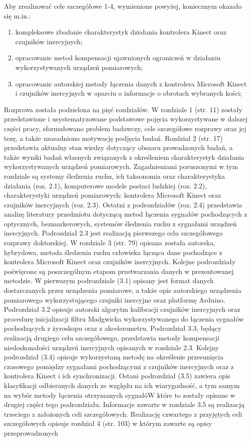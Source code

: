 \documentclass[10pt,a4paper]{report}
\begin{document}
\begin{FlushLeft}
Aby zrealizować cele szczegółowe 1-4, wymienione powyżej, koniecznym okazało się m.in.:
\begin{enumerate}[1. ]
	\item kompleksowe zbadanie charakterystyk działania kontrolera Kinect oraz czujników inercyjnych;
    \item opracowanie metod kompensacji ujawnionych ograniczeń w działaniu wykorzystywanych urządzeń pomiarowych;
	\item opracowanie autorskiej metody łączenia danych z kontrolera Microsoft Kinect i czujników inercyjnych w oparciu o informacje o obrotach wybranych kości;
\end{enumerate}

Rozprawa została podzielona na pięć rozdziałów. W rozdziale 1 (str. 11) zostały przedstawione i usystematyzowane podstawowe pojęcia wykorzystywane w dalszej części pracy, sformułowano problem badawczy, cele szczegółowe rozprawy oraz jej tezę, a także uzasadniono motywację podjęcia badań. Rozdział 2 (str. 17) przedstawia aktualny stan wiedzy dotyczący obszaru prowadzonych badań, a także wyniki badań własnych związanych z określeniem charakterystyk działania wykorzystywanych urządzeń pomiarowych. Zagadnieniami poruszonymi w tym rozdziale są systemy śledzenia ruchu, ich taksonomia oraz charakterystyka działania (roz. 2.1), komputerowe modele postaci ludzkiej (roz. 2.2), charakterystyki urządzeń pomiarowych: kontrolera Microsoft Kinect oraz czujników inercyjnych (roz. 2.3). Ostatni z podrozdziałów (roz. 2.4) przedstawia analizę literatury przedmiotu dotyczącą metod łączenia sygnałów pochodzących z optycznych, bezmarkerowych, systemów śledzenia ruchu z sygnałami urządzeń inercyjnych. Podrozdział 2.3 jest realizacją pierwszego celu szczegółowego rozprawy doktorskiej. W rozdziale 3 (str. 79) opisana została autorska, hybrydowa, metoda śledzenia ruchu człowieka łącząca dane pochodzące z kontrolera Microsoft Kinect oraz czujników inercyjnych. Kolejne podrozdziały poświęcone są poszczególnym etapom przetwarzania danych w prezentowanej metodzie. W pierwszym podrozdziale (3.1) opisany jest format danych dostarczanych przez urządzenia pomiarowe, a także opis autorskiego urządzenia pomiarowego wykorzystującego czujniki inercyjne oraz platformę Arduino. Podrozdział 3.2 opisuje autorski algorytm kalibracji czujników inercyjnych oraz procedurę inicjalizacji filtru Madgwicka wykorzystywanego do łączenia sygnałów pochodzących z żyroskopu oraz z akcelerometru. Podrozdział 3.3, będący realizacją drugiego celu szczegółowego, przedstawia metody kompensacji niedoskonałości urządzeń inercyjnych opisanych w rozdziale 2.3. Kolejny podrozdział (3.4) opisuje wykorzystaną metodę na określenie przesunięcia czasowego pomiędzy sygnałami pochodzącymi z czujników inercyjnych oraz z kontrolera Kinect i ich synchronizacji. Ostani podrozdział (3.5) zawiera opis klasyfikacji odbieranych danych ze względu na ich wiarygodność, a tym samym na wybór metody łączenia otrzymanych sygnałóW które to zostały opisane w drugiej części tego podrozdziału. Informacje zawarte w rozdziale 3.5 są realizacją trzeciego z założonych celi szczegółowych. Realizację czwartego z przyjętych celi szczegółowych opisuje rozdział 4 (str. 103) w którym zawarte są opisy przeprowadzonych 
\end{FlushLeft}
\end{document}
